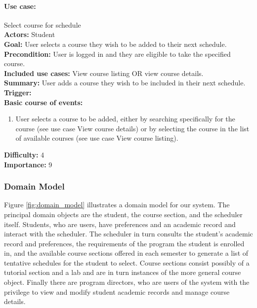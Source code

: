 \documentclass[12pt]{article}
\begin{document}
\paragraph*{Use case:} Select course for schedule\\
\textbf{Actors:} Student\\
\textbf{Goal:} User selects a course they wish to be added to their next schedule.\\
\textbf{Precondition:} User is logged in and they are eligible to take the specified course.\\
\textbf{Included use cases:} View course listing OR view course details.\\
\textbf{Summary:} User adds a course they wish to be included in their next schedule.\\
\textbf{Trigger:}\\
\textbf{Basic course of events:}
\begin{enumerate}
\item User selects a course to be added, either by searching specifically for the course
(see use case View course details) or by selecting the course in the list of available courses
(see use case View course listing).
\end{enumerate}
\textbf{Difficulty:} 4\\
\textbf{Importance:} 9\\

\subsubsection{Domain Model}
Figure \ref{fig:domain_model} illustrates a domain model for our system. The principal domain objects are the student, the course section, and the scheduler itself. Students, who are users, have preferences and an academic record and interact with the scheduler. The scheduler in turn consults the student's academic record and preferences, the requirements of the program the student is enrolled in, and the available course sections offered in each semester to generate a list of tentative schedules for the student to select. Course sections consist possibly of a tutorial section and a lab and are in turn instances of the more general course object. Finally there are program directors, who are users of the system with the privilege to view and modify student academic records and manage course details.


\vfill
\newpage
\end{document}
